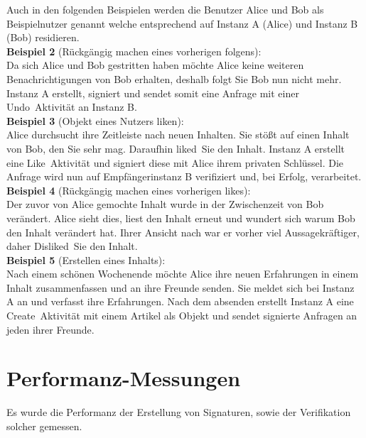 Auch in den folgenden Beispielen werden die Benutzer Alice und Bob als Beispielnutzer genannt welche entsprechend auf Instanz A (Alice) und Instanz B (Bob) residieren.\\

\textbf{Beispiel 2} (Rückgängig machen eines vorherigen folgens):\\
Da sich Alice und Bob gestritten haben möchte Alice keine weiteren Benachrichtigungen von Bob erhalten, deshalb folgt Sie Bob nun nicht mehr. Instanz A erstellt, signiert und sendet somit eine Anfrage mit einer \glqq Undo\grqq~Aktivität an Instanz B.\\

\textbf{Beispiel 3} (Objekt eines Nutzers \glqq liken\grqq):\\
Alice durchsucht ihre Zeitleiste nach neuen Inhalten. Sie stößt auf einen Inhalt von Bob, den Sie sehr mag. Daraufhin \glqq liked\grqq~Sie den Inhalt. Instanz A erstellt eine \glqq Like\grqq~Aktivität und signiert diese mit Alice ihrem privaten Schlüssel. Die Anfrage wird nun auf Empfängerinstanz B verifiziert und, bei Erfolg, verarbeitet.\\

\textbf{Beispiel 4} (Rückgängig machen eines vorherigen \glqq likes\grqq):\\
Der zuvor von Alice gemochte Inhalt wurde in der Zwischenzeit von Bob verändert. Alice sieht dies, liest den Inhalt erneut und wundert sich warum Bob den Inhalt verändert hat. Ihrer Ansicht nach war er vorher viel Aussagekräftiger, daher \glqq Disliked\grqq~Sie den Inhalt.\\

\textbf{Beispiel 5} (Erstellen eines Inhalts):\\
Nach einem schönen Wochenende möchte Alice ihre neuen Erfahrungen in einem Inhalt zusammenfassen und an ihre Freunde senden. Sie meldet sich bei Instanz A an und verfasst ihre Erfahrungen. Nach dem absenden erstellt Instanz A eine \glqq Create\grqq~Aktivität mit einem Artikel als Objekt und sendet signierte Anfragen an jeden ihrer Freunde.
\section{Performanz-Messungen}
Es wurde die Performanz der Erstellung von Signaturen, sowie der Verifikation solcher gemessen.

